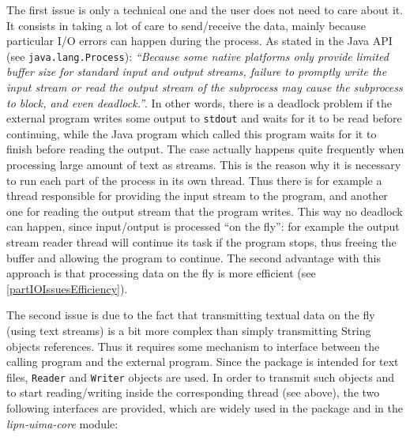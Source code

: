 \documentclass{article}
\newcommand{\uimaModule}{{\em lipn-uima-core}\xspace}
\begin{document}
The first issue is only a technical one and the user does not need to care about it. It consists in taking a lot of care to send/receive the data, mainly because particular I/O errors can happen during the process. As stated in the Java API (see {\tt java.lang.Process}): {\em ``Because some native platforms only provide limited buffer size for standard input and output streams, failure to promptly write the input stream or read the output stream of the subprocess may cause the subprocess to block, and even deadlock.''}. In other words, there is a deadlock problem if the external program writes some output to {\tt stdout} and waits for it to be read before continuing, while the Java program which called this program waits for it to finish before reading the output. The case actually happens quite frequently when processing large amount of text as streams. This is the reason why it is necessary to run each part of the process in its own thread. Thus there is for example a thread responsible for providing the input stream to the program, and another one for reading the output stream that the program writes. This way no deadlock can happen, since input/output is processed ``on the fly'': for example the output stream reader thread will continue its task if the program stops, thus freeing the buffer and allowing the program to continue. The second advantage with this approach is that processing data on the fly is more efficient (see \ref{partIOIssuesEfficiency}).

The second issue is due to the fact that transmitting textual data on the fly (using text streams) is a bit more complex than simply transmitting String objects references. Thus it requires some mechanism to interface between the calling program and the external program. Since the package is intended for text files, {\tt Reader} and {\tt Writer} objects are used. In order to transmit such objects and to start reading/writing inside the corresponding thread (see above), the two following interfaces are provided, which are widely used in the package and in the \uimaModule module:
\end{document}
